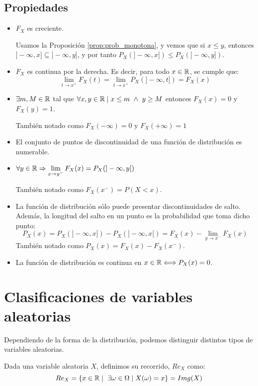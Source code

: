 \subsection{Propiedades}
\begin{itemize}
\item $F_X$ es creciente.

Usamos la Proposición \ref{prop:prob_monotona}, y vemos que si $x \leq y$, entonces $]-\infty, x] \subseteq ]-\infty, y]$, y por tanto $P_X(]-\infty, x]) \leq P_X(]-\infty, y])$.

\item $F_X$ es continua por la derecha. Es decir, para todo $x \in \mathbb R$, se cumple que:
\begin{equation*}
    \lim_{t \to x^{+}} F_X(t) =
    \lim_{t \to x^{+}} P_X(]-\infty, t]) =
    F_X(x)
\end{equation*}

\item $\exists m,M \in \mathbb R$ tal que $\forall x,y \in \mathbb R \mid x \leq m \ \land \ y \geq M$ entonces $F_X(x)=0$
        y $F_X(y)=1$.\par
      También notado como $F_X(-\infty)=0$ y $F_X(+\infty)=1$

\item El conjunto de puntos de discontinuidad de una función de distribución es numerable.
\item $\forall y \in \mathbb R \Rightarrow \lim\limits_{x \to y^{-}} F_X(x) = P_X(]-\infty, y[)$\par
      También notado como $F_X(x^{-})=P(X<x)$.
\item La función de distribución sólo puede presentar discontinuidades de salto. Además, la longitud del salto
      en un punto es la probabilidad que toma dicho punto:
      $$P_X(x) = P_X(]-\infty, x]) - P_X(]-\infty, x[) = F_X(x) - \lim\limits_{y \to x^{-}}F_X(x)$$
      También notado como $P_X(x) = F_X(x) - F_X(x^{-})$.
\item La función de distribución es continua en $x \in \mathbb R \Longleftrightarrow P_X(x) = 0$.
\end{itemize}

\section{Clasificaciones de variables aleatorias}

Dependiendo de la forma de la distribución, podemos distinguir distintos tipos de variables aleatorias.
\begin{definicion}
    Dada una variable aleatoria $X$, definimos su recorrido, $Re_X$ como:
    $$Re_X = \{x \in \mathbb R \mid \ \exists \omega \in \Omega \mid X(\omega) = x\} = Img(X)$$
\end{definicion}

